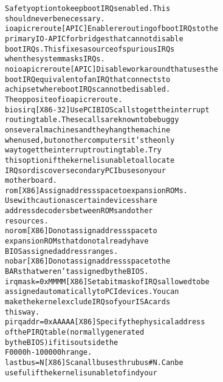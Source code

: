 \documentclass[a4paper,8pt,english]{sphinxmanual}
\begin{document}
\begin{alltt}
                                Safety option to keep boot IRQs enabled. This
                                should never be necessary.
                ioapicreroute   {[}APIC{]} Enable rerouting of boot IRQs to the
                                primary IO-APIC for bridges that cannot disable
                                boot IRQs. This fixes a source of spurious IRQs
                                when the system masks IRQs.
                noioapicreroute {[}APIC{]} Disable workaround that uses the
                                boot IRQ equivalent of an IRQ that connects to
                                a chipset where boot IRQs cannot be disabled.
                                The opposite of ioapicreroute.
                biosirq         {[}X86-32{]} Use PCI BIOS calls to get the interrupt
                                routing table. These calls are known to be buggy
                                on several machines and they hang the machine
                                when used, but on other computers it's the only
                                way to get the interrupt routing table. Try
                                this option if the kernel is unable to allocate
                                IRQs or discover secondary PCI buses on your
                                motherboard.
                rom             {[}X86{]} Assign address space to expansion ROMs.
                                Use with caution as certain devices share
                                address decoders between ROMs and other
                                resources.
                norom           {[}X86{]} Do not assign address space to
                                expansion ROMs that do not already have
                                BIOS assigned address ranges.
                nobar           {[}X86{]} Do not assign address space to the
                                BARs that weren't assigned by the BIOS.
                irqmask=0xMMMM  {[}X86{]} Set a bit mask of IRQs allowed to be
                                assigned automatically to PCI devices. You can
                                make the kernel exclude IRQs of your ISA cards
                                this way.
                pirqaddr=0xAAAAA        {[}X86{]} Specify the physical address
                                of the PIRQ table (normally generated
                                by the BIOS) if it is outside the
                                F0000h-100000h range.
                lastbus=N       {[}X86{]} Scan all buses thru bus \#N. Can be
                                useful if the kernel is unable to find your

\end{alltt}
\end{document}
